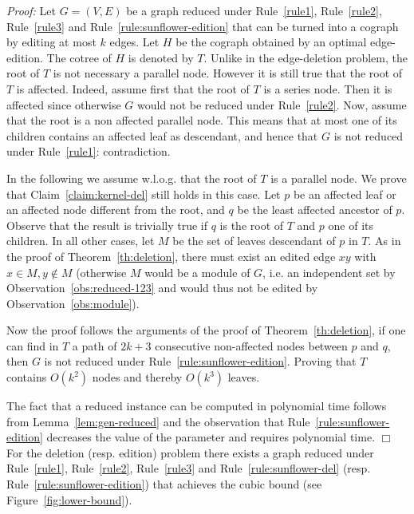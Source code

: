 \documentclass[11pt]{article}
\newenvironment{proof}{\noindent\textit{Proof: }}{{\hfill $\Box$}}
\begin{document}
\begin{proof}
Let $G = (V,E)$ be a graph reduced under Rule~\ref{rule1}, Rule~\ref{rule2}, Rule~\ref{rule3} and Rule~\ref{rule:sunflower-edition} that can be turned into a cograph by editing at most $k$ edges. Let $H$ be the cograph obtained by an optimal edge-edition. The cotree of $H$ is denoted by $T$. Unlike in the edge-deletion problem, the root of $T$ is not necessary a parallel node. However it is still true that the root of $T$ is affected. Indeed, assume first that the root of $T$ is a series node. Then it is affected since otherwise $G$ would not be reduced under Rule~\ref{rule2}. Now, assume that the root is a non affected parallel node. This means that at most one of its children contains an affected leaf as descendant, and hence that $G$ is not reduced under Rule~\ref{rule1}: contradiction.

In the following we assume w.l.o.g. that the root of $T$ is a parallel node. We prove that Claim~\ref{claim:kernel-del} still holds in this case.
Let $p$ be an affected leaf or an affected node different from the root, and $q$ be the least affected ancestor of $p$. Observe that the result is trivially true if $q$ is the root of $T$ and $p$ one of its children. In all other cases, let $M$ be the set of leaves descendant of $p$ in $T$. As in the proof of Theorem~\ref{th:deletion}, there must exist an edited edge $xy$ with $x \in M, y \notin M$ (otherwise $M$ would be a module of $G$, i.e. an independent set by Observation~\ref{obs:reduced-123} and would thus not be edited by Observation~\ref{obs:module}). 

Now the proof follows the arguments of the proof of Theorem~\ref{th:deletion}, if one can find in $T$ a path of $2k+3$ consecutive non-affected nodes between $p$ and $q$, then $G$ is not reduced under Rule~\ref{rule:sunflower-edition}. Proving that $T$ contains $O(k^2)$ nodes and thereby $O(k^3)$ leaves.

\medskip
The fact that a reduced instance can be computed in polynomial time follows from Lemma~\ref{lem:gen-reduced} and the observation that Rule~\ref{rule:sunflower-edition} decreases the value of the parameter and requires polynomial time.
\end{proof}\\

For the deletion (resp. edition) problem there exists a graph reduced under Rule~\ref{rule1}, Rule~\ref{rule2}, Rule~\ref{rule3} and Rule~\ref{rule:sunflower-del} (resp. Rule~\ref{rule:sunflower-edition}) that achieves the cubic bound (see Figure~\ref{fig:lower-bound}).
\end{document}

